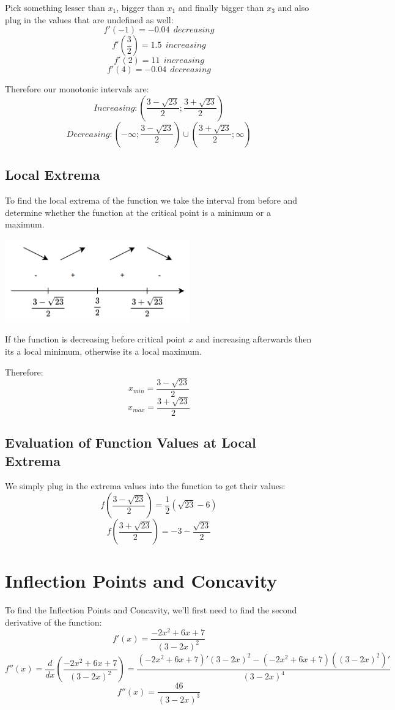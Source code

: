 \documentclass[11pt]{article}
\begin{document}
Pick something lesser than \(x_1\), bigger than \(x_1\) and finally bigger than \(x_3\) and also plug in the values that are undefined as well:
\newpage
\[
f'(-1) = -0.04 \ \ decreasing 
\]
\[
f'(\frac{3}{2}) = 1.5 \ \ increasing
\]
\[
f'(2) = 11 \ \ increasing
\]
\[
f'(4) = -0.04 \ \ decreasing
\]

Therefore our monotonic intervals are:
\[
Increasing: \left( \frac{3-\sqrt{23}}{2} ; \frac{3+\sqrt{23}}{2} \right)
\]
\[
Decreasing: \left( -\infty ; \frac{3 - \sqrt{23}}{2} \right) \cup \left( \frac{3 + \sqrt{23}}{2} ; \infty \right)
\]
\subsection{Local Extrema}
\label{sec:orgfb92f13}
To find the local extrema of the function we take the interval from before and determine whether the function at the critical point is a minimum or a maximum.
\begin{center}
\includegraphics[width=0.6\textwidth]{./skarmbild.png}
\end{center}

If the function is decreasing before critical point \(x\) and increasing afterwards then its a local minimum, otherwise its a local maximum.

Therefore:
\[
x_{min} = \frac{3-\sqrt{23}}{2}
\]
\[
x_{max} = \frac{3+\sqrt{23}}{2}
\]
\subsection{Evaluation of Function Values at Local Extrema}
\label{sec:orga420e65}
We simply plug in the extrema values into the function to get their values:
\[
f(\frac{3-\sqrt{23}}{2}) = \frac{1}{2} \left( \sqrt{23} - 6 \right)
\]
\[
f(\frac{3+\sqrt{23}}{2}) = -3-\frac{\sqrt{23}}{2}
\]
\section{Inflection Points and Concavity}
\label{sec:org27e0c99}
To find the Inflection Points and Concavity, we'll first need to find the second derivative of the function:
\[
f'(x) = \frac{-2x^2+6x+7}{(3-2x)^2}
\]
\[
f''(x) = \frac{d}{dx} \left( \frac{-2x^2+6x+7}{(3-2x)^2} \right) = \frac{\left( -2x^2+6x+7 \right)' \left( 3-2x \right)^2 - \left( -2x^2+6x+7 \right) \left(\left( 3 - 2x\right)^2\right)'}{\left(3-2x\right)^4}
\]
\[
f''(x) = \frac{46}{(3-2x)^3}
\]
\end{document}
